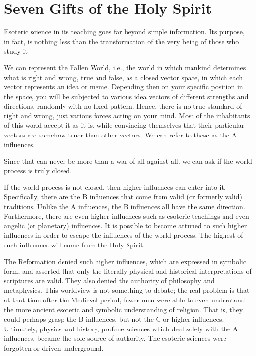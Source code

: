 \section{Seven Gifts of the Holy Spirit}

\begin{quotex}
Esoteric science in its teaching goes far beyond simple information. Its purpose, in fact, is nothing less than the transformation of the very being of those who study it 

\end{quotex}
We can represent the Fallen World, i.e., the world in which mankind determines what is right and wrong, true and false, as a closed vector space, in which each vector represents an idea or meme. Depending then on your specific position in the space, you will be subjected to various idea vectors of different strengths and directions, randomly with no fixed pattern. Hence, there is no true standard of right and wrong, just various forces acting on your mind. Most of the inhabitants of this world accept it as it is, while convincing themselves that their particular vectors are somehow truer than other vectors. We can refer to these as the A influences.

Since that can never be more than a war of all against all, we can ask if the world process is truly closed.

If the world process is not closed, then higher influences can enter into it. Specifically, there are the B influences that come from valid (or formerly valid) traditions. Unlike the A influences, the B influences all have the same direction. Furthermore, there are even higher influences such as esoteric teachings and even angelic (or planetary) influences. It is possible to become attuned to such higher influences in order to escape the influences of the world process. The highest of such influences will come from the Holy Spirit.

The Reformation denied such higher influences, which are expressed in symbolic form, and asserted that only the literally physical and historical interpretations of scriptures are valid. They also denied the authority of philosophy and metaphysics. This worldview is not something to debate; the real problem is that at that time after the Medieval period, fewer men were able to even understand the more ancient esoteric and symbolic understanding of religion. That is, they could perhaps grasp the B influences, but not the C or higher influences. Ultimately, physics and history, profane sciences which deal solely with the A influences, became the sole source of authority. The esoteric sciences were forgotten or driven underground.

